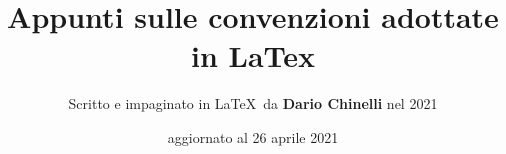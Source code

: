 \documentclass[11pt]{article}
\begin{document}
\title{\textbf{Appunti sulle convenzioni adottate in LaTex}}

\author{Scritto e impaginato in \LaTeX\ da \textbf{Dario Chinelli} nel 2021}

\date{aggiornato al 26 aprile 2021}

\maketitle

\newpage

\tableofcontents

\newpage



%
\end{document}
